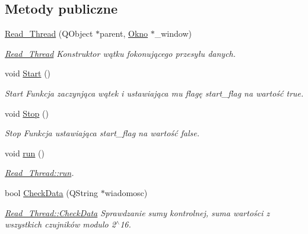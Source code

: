 \subsection*{Metody publiczne}
\begin{DoxyCompactItemize}
\item 
\hyperlink{class_read___thread_a75267b0bd2c0061ff8998a51470de609}{Read\-\_\-\-Thread} (Q\-Object $\ast$parent, \hyperlink{class_okno}{Okno} $\ast$\-\_\-window)
\begin{DoxyCompactList}\small\item\em \hyperlink{class_read___thread}{Read\-\_\-\-Thread} Konstruktor wątku fokonującego przesyłu danych. \end{DoxyCompactList}\item 
\hypertarget{class_read___thread_aac135df28f316466b880187097a268fd}{void \hyperlink{class_read___thread_aac135df28f316466b880187097a268fd}{Start} ()}\label{class_read___thread_aac135df28f316466b880187097a268fd}

\begin{DoxyCompactList}\small\item\em Start Funkcja zaczynjąca wątek i ustawiająca mu flagę start\-\_\-flag na wartość true. \end{DoxyCompactList}\item 
\hypertarget{class_read___thread_ab7f432f2160c3e884af7a80387764977}{void \hyperlink{class_read___thread_ab7f432f2160c3e884af7a80387764977}{Stop} ()}\label{class_read___thread_ab7f432f2160c3e884af7a80387764977}

\begin{DoxyCompactList}\small\item\em Stop Funkcja ustawiająca start\-\_\-flag na wartość false. \end{DoxyCompactList}\item 
void \hyperlink{class_read___thread_a261a3cc9c3dc6abe61946123c3de76dc}{run} ()
\begin{DoxyCompactList}\small\item\em \hyperlink{class_read___thread_a261a3cc9c3dc6abe61946123c3de76dc}{Read\-\_\-\-Thread\-::run}. \end{DoxyCompactList}\item 
bool \hyperlink{class_read___thread_a4b81499a6d426573733446d4af8e7b07}{Check\-Data} (Q\-String $\ast$wiadomosc)
\begin{DoxyCompactList}\small\item\em \hyperlink{class_read___thread_a4b81499a6d426573733446d4af8e7b07}{Read\-\_\-\-Thread\-::\-Check\-Data} Sprawdzanie sumy kontrolnej, suma wartości z wszystkich czujników modulo 2$^\wedge$16. \end{DoxyCompactList}\end{DoxyCompactItemize}
